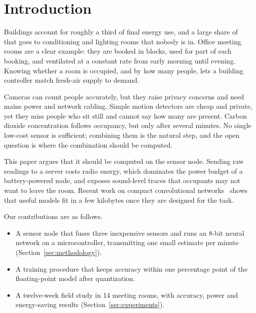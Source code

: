 \section{Introduction}\label{sec:introduction}
Buildings account for roughly a third of final energy use, and a large share of that goes to conditioning and lighting rooms that nobody is in. Office meeting rooms are a clear example: they are booked in blocks, used for part of each booking, and ventilated at a constant rate from early morning until evening. Knowing whether a room is occupied, and by how many people, lets a building controller match fresh-air supply to demand.

Cameras can count people accurately, but they raise privacy concerns and need mains power and network cabling. Simple motion detectors are cheap and private, yet they miss people who sit still and cannot say how many are present. Carbon dioxide concentration follows occupancy, but only after several minutes. No single low-cost sensor is sufficient; combining them is the natural step, and the open question is where the combination should be computed.

This paper argues that it should be computed on the sensor node. Sending raw readings to a server costs radio energy, which dominates the power budget of a battery-powered node, and exposes sound-level traces that occupants may not want to leave the room. Recent work on compact convolutional networks~\cite{howard2017mobilenets} shows that useful models fit in a few kilobytes once they are designed for the task.

Our contributions are as follows.
\begin{itemize}
  \item A sensor node that fuses three inexpensive sensors and runs an 8-bit neural network on a microcontroller, transmitting one small estimate per minute (Section~\ref{sec:methodology}).
  \item A training procedure that keeps accuracy within one percentage point of the floating-point model after quantization.
  \item A twelve-week field study in 14 meeting rooms, with accuracy, power and energy-saving results (Section~\ref{sec:experiments}).
\end{itemize}
